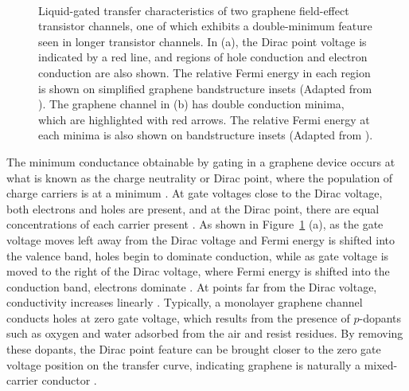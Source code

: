 \documentclass[
  a4paper,
]{scrbook}
\begin{document}
\begin{figure}
\begin{minipage}[t]{0.45\linewidth}
{{}

}

\end{minipage}%
%
\begin{minipage}[t]{0.01\linewidth}

{\centering 

~

}

\end{minipage}%

\caption{\label{fig-graphene-characteristics}Liquid-gated transfer
characteristics of two graphene field-effect transistor channels, one of
which exhibits a double-minimum feature seen in longer transistor
channels. In (a), the Dirac point voltage is indicated by a red line,
and regions of hole conduction and electron conduction are also shown.
The relative Fermi energy in each region is shown on simplified graphene
bandstructure insets (Adapted from \autocite{Geim2007,Ohno2015}). The
graphene channel in (b) has double conduction minima, which are
highlighted with red arrows. The relative Fermi energy at each minima is
also shown on bandstructure insets (Adapted from \autocite{Peng2018}).}

\end{figure}

The minimum conductance obtainable by gating in a graphene device occurs
at what is known as the charge neutrality or Dirac point, where the
population of charge carriers is at a minimum
\autocite{Novoselov2004,Bartolomeo2011,Ohno2015,Kireev2017}. At gate
voltages close to the Dirac voltage, both electrons and holes are
present, and at the Dirac point, there are equal concentrations of each
carrier present \autocite{Novoselov2004,Bartolomeo2011,Peng2018}. As
shown in Figure~\ref{fig-graphene-characteristics} (a), as the gate
voltage moves left away from the Dirac voltage and Fermi energy is
shifted into the valence band, holes begin to dominate conduction, while
as gate voltage is moved to the right of the Dirac voltage, where Fermi
energy is shifted into the conduction band, electrons dominate
\autocite{Novoselov2004,Bartolomeo2011,Feng2014,Zhang2015}. At points
far from the Dirac voltage, conductivity increases linearly
\autocite{Novoselov2004,Bartolomeo2011,Peng2018}. Typically, a monolayer
graphene channel conducts holes at zero gate voltage, which results from
the presence of \(p\)-dopants such as oxygen and water adsorbed from the
air and resist residues. By removing these dopants, the Dirac point
feature can be brought closer to the zero gate voltage position on the
transfer curve, indicating graphene is naturally a mixed-carrier
conductor
\autocite{Novoselov2004,Bartolomeo2011,Zhang2015,Kireev2017,Peng2018}.
\end{document}
